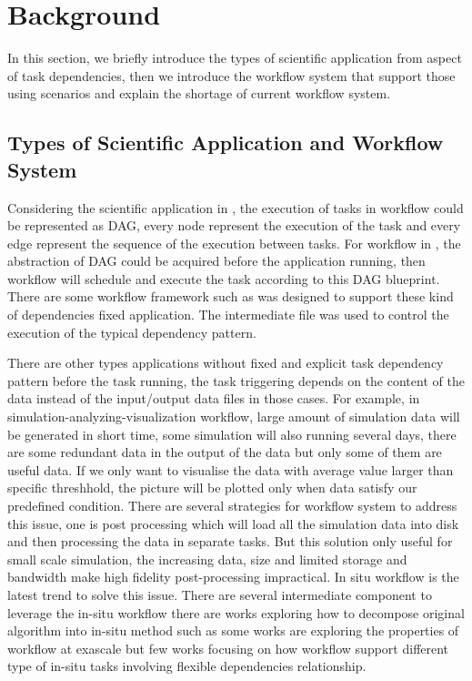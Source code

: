 \section{Background}
In this section, we briefly introduce the types of scientific application from aspect of task dependencies, then we introduce the workflow system that support those using scenarios and explain the shortage of current workflow system.

\subsection{Types of Scientific Application and Workflow System}
Considering the scientific application in \cite{makeflowexample}, the execution of tasks in workflow could be represented as DAG, every node represent the execution of the task and every edge represent the sequence of the execution between tasks. For workflow in \cite{makeflowexample}, the abstraction of DAG could be acquired before the application running, then workflow will schedule and execute the task according to this DAG blueprint. There are some workflow framework such as \cite{albrecht2012makeflow,wilde2011swift} was designed to support these kind of dependencies fixed application. The intermediate file was used to control the execution of the typical dependency pattern\cite{bharathi2008characterization}.

There are other types applications without fixed and explicit task dependency pattern before the task running, the task triggering depends on the content of the data instead of the input/output data files in those cases. For example, in simulation-analyzing-visualization workflow, large amount of simulation data will be generated in short time, some simulation will also running several days, there are some redundant data in the output of the data but only some of them are useful data. If we only want to visualise the data  with average value larger than specific threshhold, the picture will be plotted only when data satisfy our predefined  condition. There are several strategies for workflow system to address this issue, one is post processing which will load all the simulation data into disk and then processing the data in separate tasks. But this solution only useful for small scale simulation, the increasing data, size and limited storage and bandwidth make high fidelity post-processing impractical\cite{ayachit2015paraview}. In situ workflow is the latest trend to solve this issue\cite{dreher2017situ}. There are several intermediate component to leverage the in-situ workflow\cite{docan2012dataspaces,ayachit2015paraview}  there are works exploring how to decompose original algorithm into in-situ method such as\cite{bennett2012combining} some works are exploring the properties of workflow at exascale\cite{dreher2017situ} but  few works focusing on how workflow support different type of in-situ tasks involving flexible dependencies relationship. 

